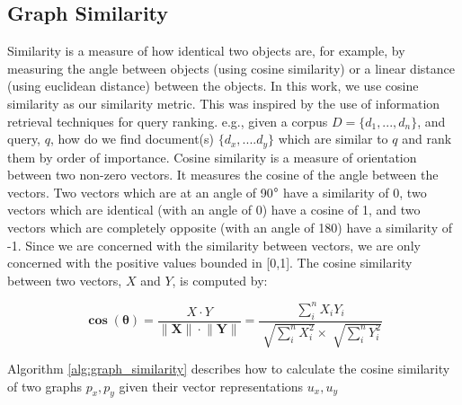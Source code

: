 %
% 
% 

\subsection{Graph Similarity} \label{similarity}
Similarity is a measure of how identical two objects are, for example, by measuring the angle between objects (using cosine similarity) or a linear distance (using euclidean distance) between the objects. In this work, we use cosine similarity as our similarity metric. This was inspired by the use of information retrieval techniques for query ranking. e.g., given a corpus $D = \{ d_1,..., d_n\}$, and query, $q$, how do we find document(s) $\{d_x,....d_y\}$ which are similar to $q$ and rank them by order of importance. Cosine similarity is a measure of orientation between two non-zero vectors. It measures the cosine of the angle between the vectors. Two vectors which are at an angle of 90$\degree$ have a similarity of 0, two vectors which are identical (with an angle of 0\degree) have a cosine of 1, and two vectors which are completely opposite (with an angle of 180\degree) have a similarity of -1. Since we are concerned with the similarity between vectors, we are only concerned with the positive values bounded in [0,1]. The cosine similarity between two vectors, $X$ and $Y$, is computed by:

\[\mathbf{\cos{(\theta)}} = \dfrac{X \cdot  Y}{ \lVert \mathbf{X} \rVert \cdot \lVert \mathbf{Y} \rVert} =\dfrac{\sum_{i}^n X_i Y_i }{\sqrt[]{\sum_{i}^n X_i^2} \times \sqrt[]{\sum_{i}^n Y_i^2}}  \]

Algorithm \ref{alg:graph_similarity} describes how to calculate the cosine similarity of two graphs $p_x, p_y$ given their vector representations $u_x, u_y$


